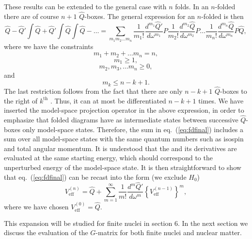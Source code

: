 These results can be extended to the general case with $n$ folds. In
an $n$-folded \qbox there are of course $n+1$ $\hat{Q}$-boxes. The 
general expression for an $n$-folded \qbox is then
\begin{equation}
        \hat{Q}   -\hat{Q}'\int\hat{Q} 
    +\hat{Q}'\int\hat{Q}\int\hat{Q} -\dots=
    {\displaystyle\sum_{m_1m_2\dots m_n}}
    \frac{1}{m_1!}\frac{d^{m_1}\hat{Q}'}{d\omega^{m_1}}P
    \frac{1}{m_2!}\frac{d^{m_2}\hat{Q}}{d\omega^{m_2}}P
    \dots
    \frac{1}{m_n!}\frac{d^{m_n}\hat{Q}}{d\omega^{m_n}}P\hat{Q},
\label{eq:fdfinal}
\end{equation}
where we have the constraints
\[
  m_1+m_2+\dots m_n=n,
\]
\[
m_1\geq 1,
\]
\[
m_2, m_3, \dots m_n \geq 0,
\]
and
\[
m_k \leq n-k+1.
\]
The last restriction follows from the fact that there are only
$n-k+1$ $\hat{Q}$-boxes to the right of $k^{\mathrm{th}}$ \qbox.
Thus, it can at most be differentiated $n-k+1$ times. 
We have inserted the model-space projection operator in the above
expression, in order to emphasize that folded diagrams have as intermediate
states between successive $\hat{Q}$-boxes 
only model-space states. Therefore, the sum in eq.\ (\ref{eq:fdfinal})
includes a sum over all model-space states with the same quantum 
numbers such as isospin and total angular momentum. It is understood
that the \qbox  and its derivatives are evaluated at the
same starting energy, which should correspond to the unperturbed 
energy of the model-space state.     
It is then straightforward to show that eq.\ (\ref{eq:fdfinal}) 
can be recast into the form (we exclude $H_0$)
\begin{equation}
    V_{\mathrm{eff}}^{(n)}=\hat{Q}+{\displaystyle\sum_{m=1}^{\infty}}
    \frac{1}{m!}\frac{d^m\hat{Q}'}{d\omega^m}\left\{
    V_{\mathrm{eff}}^{(n-1)}\right\}^m,
\end{equation}
where we have chosen $V_{\mathrm{eff}}^{(0)}=\hat{Q}$. 

This expansion will be studied for finite nuclei in section 6. In the next
section we discuss the evaluation of the $G$-matrix for both finite
nuclei and nuclear matter.
